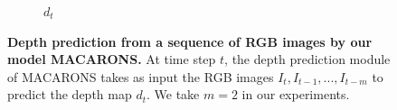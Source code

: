 \begin{figure}
  \hfill
  \begin{subfigure}{0.23\linewidth}
    \fbox{\rule{0pt}{0.5in} \rule{.9\linewidth}{0pt}}
    \caption{\scriptsize $d_t$}
  \end{subfigure}
  \caption{\textbf{Depth prediction from a sequence of RGB images by our model MACARONS.} At time step $t$, the depth prediction module of MACARONS takes as input the RGB images $I_t, I_{t-1}, ..., I_{t-m}$ to predict the depth map $d_t$. We take $m=2$ in our experiments.}
  \label{fig:supp-mat-rgb-depth}
\end{figure}